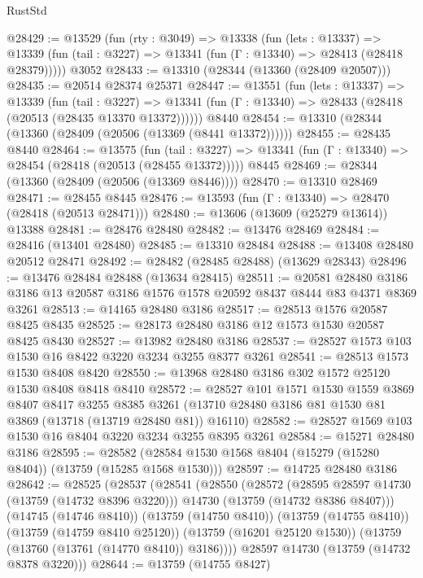 \begin{lexlean}{RustStd}
\begin{coremodule}
@28429 := @13529
    (fun (rty : @3049) =>
    @13338
      (fun (lets : @13337) =>
      @13339 (fun (tail : @3227) => @13341 (fun (Γ : @13340) => @28413 (@28418 @28379)))))
    @3052
@28433 := @13310 (@28344 (@13360 (@28409 @20507)))
@28435 := @20514 @28374 @25371
@28447 := @13551
    (fun (lets : @13337) =>
    @13339
      (fun (tail : @3227) =>
      @13341 (fun (Γ : @13340) => @28433 (@28418 (@20513 (@28435 @13370 @13372))))))
    @8440
@28454 := @13310 (@28344 (@13360 (@28409 (@20506 (@13369 (@8441 @13372))))))
@28455 := @28435 @8440
@28464 := @13575
    (fun (tail : @3227) => @13341 (fun (Γ : @13340) => @28454 (@28418 (@20513 (@28455 @13372)))))
    @8445
@28469 := @28344 (@13360 (@28409 (@20506 (@13369 @8446))))
@28470 := @13310 @28469
@28471 := @28455 @8445
@28476 := @13593 (fun (Γ : @13340) => @28470 (@28418 (@20513 @28471)))
@28480 := @13606 (@13609 (@25279 @13614)) @13388
@28481 := @28476 @28480
@28482 := @13476 @28469
@28484 := @28416 (@13401 @28480)
@28485 := @13310 @28484
@28488 := @13408 @28480 @20512 @28471
@28492 := @28482 (@28485 @28488) (@13629 @28343)
@28496 := @13476 @28484 @28488 (@13634 @28415)
@28511 := @20581
    @28480
    @3186
    @3186
    @13
    @20587
    @3186
    @1576
    @1578
    @20592
    @8437
    @8444
    @83
    @4371
    @8369
    @3261
@28513 := @14165 @28480 @3186
@28517 := @28513 @1576 @20587 @8425 @8435
@28525 := @28173 @28480 @3186 @12 @1573 @1530 @20587 @8425 @8430
@28527 := @13982 @28480 @3186
@28537 := @28527 @1573 @103 @1530 @16 @8422 @3220 @3234 @3255 @8377 @3261
@28541 := @28513 @1573 @1530 @8408 @8420
@28550 := @13968 @28480 @3186 @302 @1572 @25120 @1530 @8408 @8418 @8410
@28572 := @28527
    @101
    @1571
    @1530
    @1559
    @3869
    @8407
    @8417
    @3255
    @8385
    @3261
    (@13710 @28480 @3186 @81 @1530 @81 @3869 (@13718 (@13719 @28480 @81)) @16110)
@28582 := @28527 @1569 @103 @1530 @16 @8404 @3220 @3234 @3255 @8395 @3261
@28584 := @15271 @28480 @3186
@28595 := @28582 (@28584 @1530 @1568 @8404 (@15279 (@15280 @8404)) (@13759 (@15285 @1568 @1530)))
@28597 := @14725 @28480 @3186
@28642 := @28525
    (@28537
      (@28541
        (@28550
          (@28572
            (@28595 @28597 @14730 (@13759 (@14732 @8396 @3220)))
            @14730
            (@13759 (@14732 @8386 @8407)))
          (@14745 (@14746 @8410))
          (@13759 (@14750 @8410))
          (@13759 (@14755 @8410))
          (@13759 (@14759 @8410 @25120))
          (@13759 (@16201 @25120 @1530))
          (@13759 (@13760 (@13761 (@14770 @8410)) @3186))))
      @28597
      @14730
      (@13759 (@14732 @8378 @3220)))
@28644 := @13759 (@14755 @8427)

\end{coremodule}
\end{lexlean}

